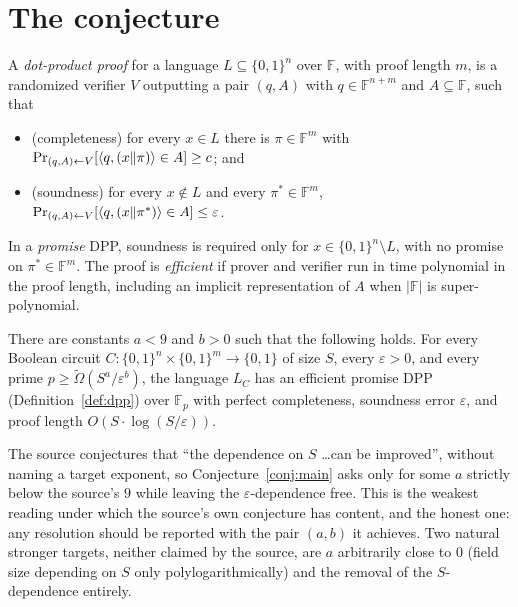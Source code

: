 \documentclass{aicr-conjecture}
\newcommand{\F}{\mathbb{F}}
\newcommand{\eps}{\varepsilon}
\newcommand{\Omt}{\widetilde{\Omega}}
\begin{document}
\section{The conjecture}\label{sec:conjectures}

\begin{definition}
  \label{def:dpp}
A \emph{dot-product proof} for a language $L \subseteq \{0,1\}^{n}$ over
$\F$, with proof length $m$, is a randomized verifier $V$ outputting a
pair $(q, A)$ with $q \in \F^{n+m}$ and $A \subseteq \F$, such that
\begin{itemize}[nosep]
  \item (completeness) for every $x \in L$ there is $\pi \in \F^{m}$
    with $\Pr_{(q,A) \leftarrow V}[\langle q, (x \| \pi) \rangle \in A] \ge
    c$; and
  \item (soundness) for every $x \notin L$ and every $\pi^{*} \in
    \F^{m}$, $\Pr_{(q,A) \sample V}[\langle q, (x \| \pi^{*}) \rangle
    \in A] \le \eps$.
\end{itemize}
In a \emph{promise} DPP, soundness is required only for $x \in
\{0,1\}^{n} \setminus L$, with no promise on $\pi^{*} \in \F^{m}$. The
proof is \emph{efficient} if prover and verifier run in time polynomial
in the proof length, including an implicit representation of $A$ when
$|\F|$ is super-polynomial.
\end{definition}

\begin{conjecture}\label{conj:main}
There are constants $a < 9$ and $b > 0$ such that the following holds.
For every Boolean circuit $C : \{0,1\}^{n} \times \{0,1\}^{m} \to
\{0,1\}$ of size $S$, every $\eps > 0$, and every prime $p \ge
\Omt(S^{a} / \eps^{b})$, the language $L_{C}$ has an efficient promise
DPP (Definition~\ref{def:dpp}) over $\F_{p}$ with perfect completeness,
soundness error $\eps$, and proof length $O(S \cdot \log(S/\eps))$.
\end{conjecture}

\begin{remark}
The source conjectures that ``the dependence on $S$ \dots can be
improved'', without naming a target exponent, so
Conjecture~\ref{conj:main} asks only for some $a$ strictly below the
source's $9$ while leaving the $\eps$-dependence free. This is the
weakest reading under which the source's own conjecture has content, and
the honest one: any resolution should be reported with the pair $(a,b)$
it achieves. Two natural stronger targets, neither claimed by the source,
are $a$ arbitrarily close to $0$ (field size depending on $S$ only
polylogarithmically) and the removal of the $S$-dependence entirely.
\end{remark}
\end{document}
